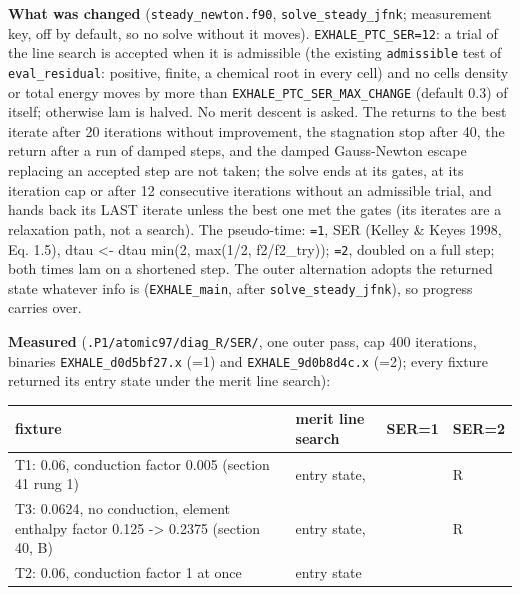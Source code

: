 \documentclass[english,a4paper]{my_memo}
\begin{document}
\textbf{What was changed} (\texttt{steady\_newton.f90}, \texttt{solve\_steady\_jfnk}; measurement
key, off by default, so no solve without it moves). \texttt{EXHALE\_PTC\_SER=1\textbar{}2}:
a trial of the line search is accepted when it is admissible (the existing
\texttt{admissible} test of \texttt{eval\_residual}: positive, finite, a chemical root in
every cell) and no cell\textquotesingle s density or total energy moves by more than
\texttt{EXHALE\_PTC\_SER\_MAX\_CHANGE} (default 0.3) of itself; otherwise lam is halved.
No merit descent is asked. The returns to the best iterate after 20
iterations without improvement, the stagnation stop after 40, the return
after a run of damped steps, and the damped Gauss-Newton escape replacing
an accepted step are not taken; the solve ends at its gates, at its
iteration cap or after 12 consecutive iterations without an admissible
trial, and hands back its LAST iterate unless the best one met the gates
(its iterates are a relaxation path, not a search). The pseudo-time: \texttt{=1},
SER (Kelley \& Keyes 1998, Eq. 1.5), dtau \textless- dtau min(2, max(1/2,
f2/f2\_try)); \texttt{=2}, doubled on a full step; both times lam on a shortened
step. The outer alternation adopts the returned state whatever info is
(\texttt{EXHALE\_main}, after \texttt{solve\_steady\_jfnk}), so progress carries over.

\textbf{Measured} (\texttt{.P1/atomic97/diag\_R/SER/}, one outer pass, cap 400
iterations, binaries \texttt{EXHALE\_d0d5bf27.x} (=1) and \texttt{EXHALE\_9d0b8d4c.x} (=2);
every fixture returned its entry state under the merit line search):

{\def\LTcaptype{none} %
{\small
\begin{longtable}[]{@{}>{\raggedright\arraybackslash}p{\dimexpr(\linewidth-8\tabcolsep)/4\relax}>{\raggedright\arraybackslash}p{\dimexpr(\linewidth-8\tabcolsep)/4\relax}>{\raggedright\arraybackslash}p{\dimexpr(\linewidth-8\tabcolsep)/4\relax}>{\raggedright\arraybackslash}p{\dimexpr(\linewidth-8\tabcolsep)/4\relax}@{}}
\toprule\noalign{}
fixture & merit line search & SER=1 & SER=2 \\
\midrule\noalign{}
\endhead
\bottomrule\noalign{}
\endlastfoot
T1: 0.06, conduction factor 0.005 (section 41 rung 1) & entry state, & & R \\
T3: 0.0624, no conduction, element enthalpy factor 0.125 -\textgreater{} 0.2375 (section 40, B) & entry state, & & R \\
T2: 0.06, conduction factor 1 at once & entry state & & \\
\end{longtable}
}
}
\end{document}

